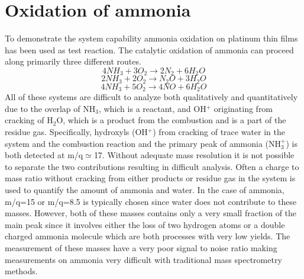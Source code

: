 \documentclass[aip,rsi]{revtex4-1}
\begin{document}
\section{Oxidation of ammonia}
To demonstrate the system capability ammonia oxidation on platinum thin films has been used as test reaction. The catalytic oxidation of ammonia can proceed along primarily three different routes.
\begin{equation}
4NH_3+3O_2\rightarrow 2N_2 + 6H_2O
\label{eq:Pt_clean_combustion}
\end{equation}
\begin{equation}
2NH_3+2O_2\rightarrow N_2O + 3H_2O
\end{equation}
\begin{equation}
4NH_3+5O_2\rightarrow 4NO + 6H_2O
\end{equation}
All of these systems are difficult to analyze both qualitatively and quantitatively due to the overlap of NH$_3$, which is a reactant, and OH$^+$ originating from cracking of H$_2$O, which is a product from the combustion and is a part of the residue gas. Specifically, hydroxyls (OH$^{+}$) from cracking of trace water in the system and the combustion reaction and the primary peak of ammonia (NH$_{3}^{+}$) is both detected at m/q$\simeq$17. Without adequate mass resolution it is not possible to separate the two contributions resulting in difficult analysis. Often a charge to mass ratio without cracking from either products or residue gas in the system is used to quantify the amount of ammonia and water. In the case of ammonia, m/q=15 or m/q=8.5 is typically chosen since water does not contribute to these masses. However, both of these masses contains only a very small fraction of the main peak since it involves either the loss of two hydrogen atoms or a double charged ammonia molecule which are both processes with very low yields. The measurement of these masses have a very poor signal to noise ratio making measurements on ammonia very difficult with traditional mass spectrometry methods.
\end{document}
